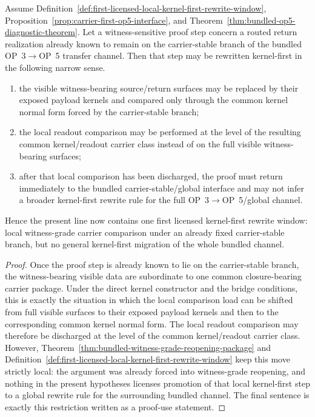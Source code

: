 \begin{proposition}
\label{prop:first-licensed-local-kernel-first-rewrite-window}
Assume Definition~\ref{def:first-licensed-local-kernel-first-rewrite-window}, Proposition~\ref{prop:carrier-first-op5-interface}, and Theorem~\ref{thm:bundled-op5-diagnostic-theorem}. Let a witness-sensitive proof step concern a routed return realization already known to remain on the carrier-stable branch of the bundled OP~3$\to$OP~5 transfer channel. Then that step may be rewritten kernel-first in the following narrow sense.
\begin{enumerate}[leftmargin=2em,label=(\roman*)]
\item the visible witness-bearing source/return surfaces may be replaced by their exposed payload kernels and compared only through the common kernel normal form forced by the carrier-stable branch;
\item the local readout comparison may be performed at the level of the resulting common kernel/readout carrier class instead of on the full visible witness-bearing surfaces;
\item after that local comparison has been discharged, the proof must return immediately to the bundled carrier-stable/global interface and may not infer a broader kernel-first rewrite rule for the full OP~3$\to$OP~5/global channel.
\end{enumerate}
Hence the present line now contains one first licensed kernel-first rewrite window: local witness-grade carrier comparison under an already fixed carrier-stable branch, but no general kernel-first migration of the whole bundled channel.
\end{proposition}

\begin{proof}
Once the proof step is already known to lie on the carrier-stable branch, the witness-bearing visible data are subordinate to one common closure-bearing carrier package. Under the direct kernel constructor and the bridge conditions, this is exactly the situation in which the local comparison load can be shifted from full visible surfaces to their exposed payload kernels and then to the corresponding common kernel normal form. The local readout comparison may therefore be discharged at the level of the common kernel/readout carrier class. However, Theorem~\ref{thm:bundled-witness-grade-reopening-package} and Definition~\ref{def:first-licensed-local-kernel-first-rewrite-window} keep this move strictly local: the argument was already forced into witness-grade reopening, and nothing in the present hypotheses licenses promotion of that local kernel-first step to a global rewrite rule for the surrounding bundled channel. The final sentence is exactly this restriction written as a proof-use statement.
\end{proof}


